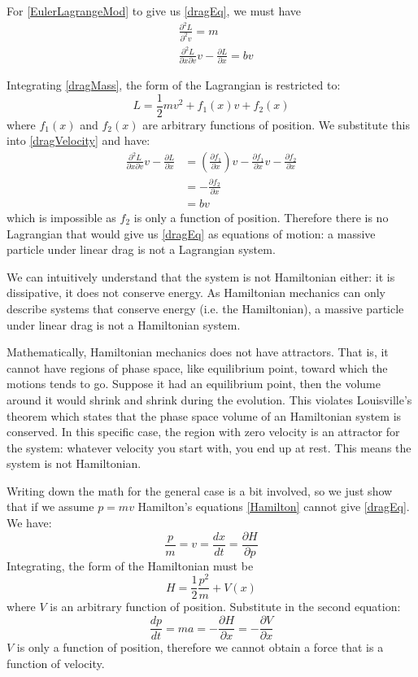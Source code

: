 \documentclass[11pt]{article}
\begin{document}
For \eqref{EulerLagrangeMod} to give us \eqref{dragEq}, we must have
\begin{align}
\label{dragMass}
&\frac{\partial^2 L}{\partial^2 v} = m \\
\label{dragVelocity}
&\frac{\partial^2 L}{\partial x \partial v} v - \frac{\partial L}{\partial x} = bv
\end{align}

Integrating \eqref{dragMass}, the form of the Lagrangian is restricted to:
\begin{equation*}
L = \frac{1}{2} m v^2 + f_1(x) v + f_2 (x)
\end{equation*}
where $f_1(x)$ and $f_2 (x)$ are arbitrary functions of position. We substitute this into \eqref{dragVelocity} and have:
\begin{align*}
\frac{\partial^2 L}{\partial x \partial v} v - \frac{\partial L}{\partial x} &= (\frac{\partial f_1}{\partial x}) v - \frac{\partial f_1}{\partial x} v -  \frac{\partial f_2}{\partial x} \\
&= -  \frac{\partial f_2}{\partial x} \\
&= bv
\end{align*}
which is impossible as $f_2$ is only a function of position. Therefore there is no Lagrangian that would give us \eqref{dragEq} as equations of motion: a massive particle under linear drag is not a Lagrangian system.

We can intuitively understand that the system is not Hamiltonian either: it is dissipative, it does not conserve energy. As Hamiltonian mechanics can only describe systems that conserve energy (i.e. the Hamiltonian), a massive particle under linear drag is not a Hamiltonian system.

Mathematically, Hamiltonian mechanics does not have attractors. That is, it cannot have regions of phase space, like equilibrium point, toward which the motions tends to go. Suppose it had an equilibrium point, then the volume around it would shrink and shrink during the evolution. This violates Louisville's theorem which states that the phase space volume of an Hamiltonian system is conserved. In this specific case, the region with zero velocity is an attractor for the system: whatever velocity you start with, you end up at rest. This means the system is not Hamiltonian.

Writing down the math for the general case is a bit involved, so we just show that if we assume $p=mv$ Hamilton's equations \eqref{Hamilton} cannot give \eqref{dragEq}. We have:
\begin{equation*}
\frac{p}{m}=v= \frac{dx}{dt} = \frac{\partial H}{\partial p}
\end{equation*}
Integrating, the form of the Hamiltonian must be
\begin{equation*}
H=\frac{1}{2}\frac{p^2}{m} + V(x)
\end{equation*}
where $V$ is an arbitrary function of position. Substitute in the second equation:
\begin{equation*}
\frac{dp}{dt}= ma = - \frac{\partial H}{\partial x} = - \frac{\partial V}{\partial x}
\end{equation*}
$V$ is only a function of position, therefore we cannot obtain a force that is a function of velocity.
\end{document}
